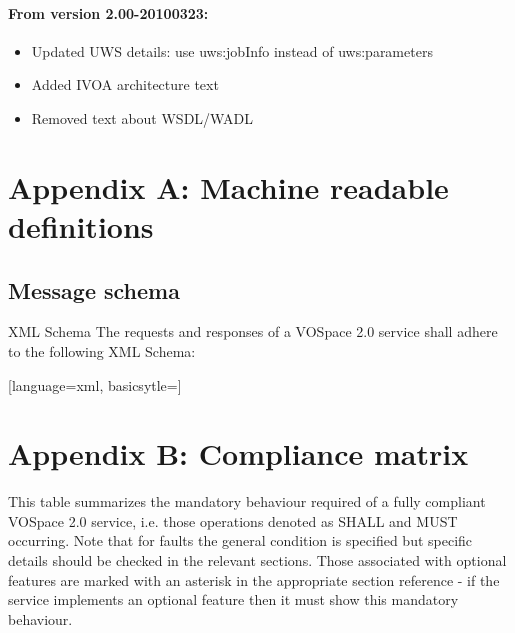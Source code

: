 \documentclass[11pt,a4paper]{ivoa}
\begin{document}
\paragraph{From version 2.00-20100323:}
\begin{itemize}
    \item Updated UWS details: use uws:jobInfo instead of uws:parameters
    \item Added IVOA architecture text
    \item Removed text about WSDL/WADL
\end{itemize}

\section{Appendix A: Machine readable definitions}
\label{sec:appendix a: machine readable definitions}
\subsection{Message schema}
\label{subsec:message schema}
XML Schema
The requests and responses of a VOSpace 2.0 service shall adhere to the following XML Schema:

[language=xml, basicsytle=\scriptsize]

\section{Appendix B: Compliance matrix}
\label{sec:appendix b: compliance matrix}
This table summarizes the mandatory behaviour required of a fully compliant VOSpace 2.0 service, i.e. those operations denoted as SHALL and MUST occurring. Note that for faults the general condition is specified but specific details should be checked in the relevant sections. Those associated with optional features are marked with an asterisk in the appropriate section reference - if the service implements an optional feature then it must show this mandatory behaviour.
\end{document}
